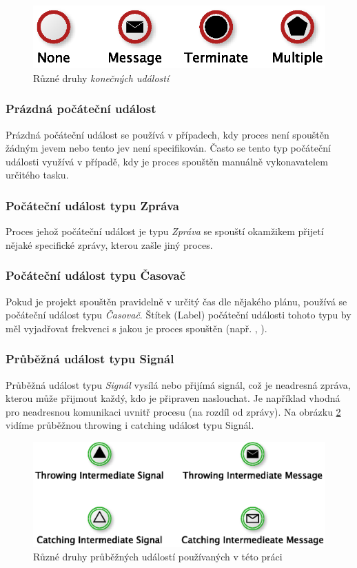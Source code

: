 \begin{figure}[htbp]\centering
\includegraphics{obrazky/end-events}
\caption{Různé druhy \textit{konečných událostí}}
\label{fig:konecne_udalosti}
\end{figure}

\subsubsection{Prázdná počáteční událost}
Prázdná počáteční událost se používá v případech, kdy proces není spouštěn žádným jevem nebo tento jev není specifikován. Často se tento typ počáteční události využívá v případě, kdy je proces spouštěn manuálně vykonavatelem určitého tasku.

\subsubsection{Počáteční událost typu Zpráva}
Proces jehož počáteční událost je typu \textit{Zpráva} se spouští okamžikem přijetí nějaké specifické zprávy, kterou zašle jiný proces.

\subsubsection{Počáteční událost typu Časovač}
Pokud je projekt spouštěn pravidelně v určitý čas dle nějakého plánu, používá se počáteční událost typu \textit{Časovač}. Štítek (Label) počáteční události tohoto typu by měl vyjadřovat frekvenci s jakou je proces spouštěn (např. , ).

\subsubsection{Průběžná událost typu Signál}
Průběžná událost typu \textit{Signál} vysílá nebo přijímá signál, což je neadresná zpráva, kterou může přijmout každý, kdo je připraven naslouchat. Je například vhodná pro neadresnou komunikaci uvnitř procesu (na rozdíl od zprávy). Na obrázku \ref{fig:prubezne_udalosti} vidíme průběžnou throwing i catching událost typu Signál. 

\begin{figure}[htbp]\centering
\includegraphics{obrazky/intermediate-events-signals-messages}
\caption{Různé druhy průběžných událostí používaných v této práci}
\label{fig:prubezne_udalosti}
\end{figure}

